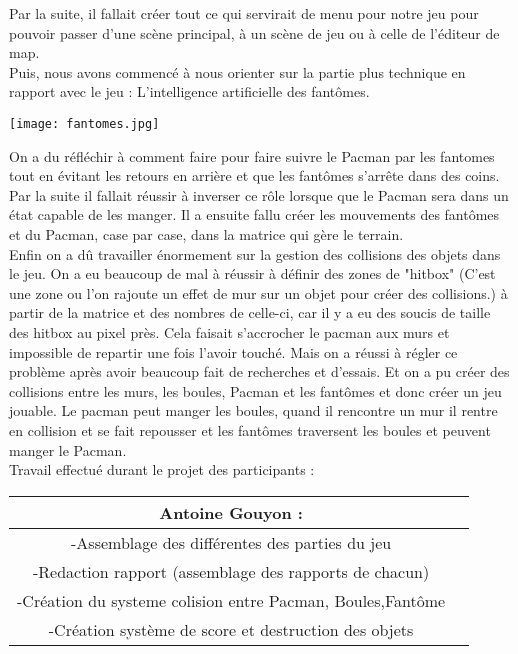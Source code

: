 \documentclass[12pt,a4paper,article]{article} %
\begin{document}
Par la suite, il fallait créer tout ce qui servirait de menu pour notre jeu pour pouvoir passer d'une scène principal, à un scène de jeu ou à celle de l'éditeur de map.\\


Puis, nous avons commencé à nous orienter sur la partie plus technique en rapport avec le jeu : L'intelligence artificielle des fantômes.
\begin{center}
\texttt{[image: fantomes.jpg]}
\end{center}

On a du réfléchir à comment faire pour faire suivre le Pacman par les fantomes tout en évitant les retours en arrière et que les fantômes s'arrête dans des coins. Par la suite il fallait réussir à inverser ce rôle lorsque que le Pacman sera dans un état capable de les manger. Il a ensuite fallu créer les mouvements des fantômes et du Pacman, case par case, dans la matrice qui gère le terrain.\\

Enfin on a d\^u travailler énormement sur la gestion des collisions des objets dans le jeu. On a eu beaucoup de mal à réussir à définir des zones de "hitbox" (C'est une zone ou l'on rajoute un effet de mur sur un objet pour créer des collisions.) à partir de la matrice et des nombres de celle-ci, car il y a eu des soucis de taille des hitbox au pixel près. Cela faisait s'accrocher le pacman aux murs et impossible de repartir une fois l'avoir touché. Mais on a réussi à régler ce problème après avoir beaucoup fait de recherches et d'essais. Et on a pu créer des collisions entre les murs, les boules, Pacman et les fantômes et donc créer un jeu jouable. Le pacman peut manger les boules, quand il rencontre un mur il rentre en collision et se fait repousser et les fantômes traversent les boules et peuvent manger le Pacman.\\

Travail effectué durant le projet des participants :   \\


\begin{tabular}{|c|c}
  \hline
  Antoine Gouyon : \\
  \hline
  -Assemblage des différentes des parties du jeu\\
  -Redaction rapport (assemblage des rapports de chacun)\\
  -Création du systeme colision entre Pacman, Boules,Fantôme\\
  -Création système de score et destruction des objets\\
  \hline
\end{tabular}
\end{document}
